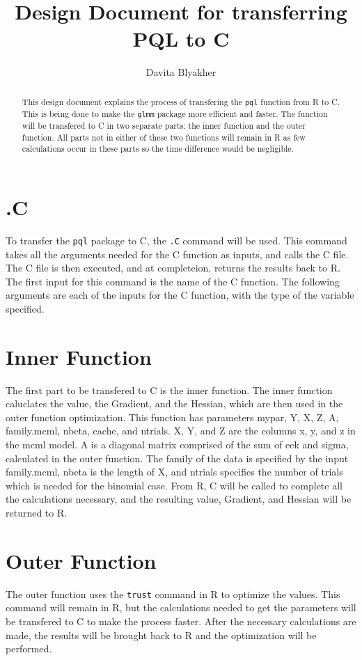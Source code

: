 \documentclass{article}
\title{Design Document for transferring PQL to C}
\author{Davita Blyakher}
\begin{document}
\maketitle{}

\begin{abstract}
This design document explains the process of transfering the \texttt{pql} function from R to C. This is being done to make the \texttt{glmm} package more efficient and faster. The function will be transfered to C in two separate parts: the inner function and the outer function. All parts not in either of these two functions will remain in R as few calculations occur in these parts so the time difference would be negligible.  
\end{abstract}

\section{.C}
To transfer the \texttt{pql} package to C, the \texttt{.C} command will be used. This command takes all the arguments needed for the C function as inputs, and calls the C file. The C file is then executed, and at completeion, returns the results back to R. The first input for this command is the name of the C function. The following arguments are each of the inputs for the C function, with the type of the variable specified. 

\section {Inner Function}
The first part to be transfered to C is the inner function. The inner function caluclates the value, the Gradient, and the Hessian, which are then used in the outer function optimization. This function has parameters mypar, Y, X, Z, A, family.mcml, nbeta, cache, and ntrials. X, Y, and Z are the columns x, y, and z in the mcml model. A is a diagonal matrix comprised of the sum of eek and sigma, calculated in the outer function. The family of the data is specified by the input family.mcml, nbeta is the length of X, and ntrials specifies the number of trials which is needed for the binomial case. From R, C will be called to complete all the calculations necessary, and the resulting value, Gradient, and Hessian will be returned to R. 

\section {Outer Function}
The outer function uses the \texttt{trust} command in R to optimize the values. This command will remain in R, but the calculations needed to get the parameters will be transfered to C to make the process faster. After the necessary calculations are made, the results will be brought back to R and the optimization will be performed. 
\end{document}
